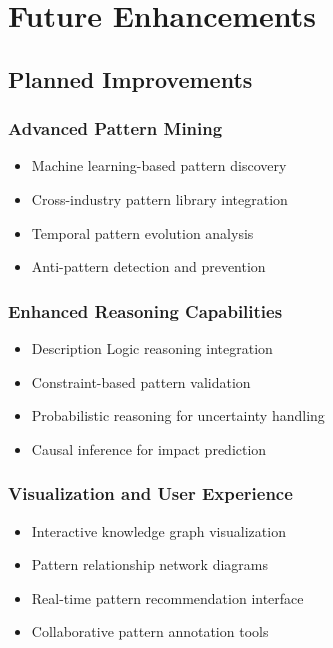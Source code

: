 \documentclass[12pt,a4paper]{article}
\begin{document}
\section{Future Enhancements}

\subsection{Planned Improvements}

\subsubsection{Advanced Pattern Mining}
\begin{itemize}
    \item Machine learning-based pattern discovery
    \item Cross-industry pattern library integration
    \item Temporal pattern evolution analysis
    \item Anti-pattern detection and prevention
\end{itemize}

\subsubsection{Enhanced Reasoning Capabilities}
\begin{itemize}
    \item Description Logic reasoning integration
    \item Constraint-based pattern validation
    \item Probabilistic reasoning for uncertainty handling
    \item Causal inference for impact prediction
\end{itemize}

\subsubsection{Visualization and User Experience}
\begin{itemize}
    \item Interactive knowledge graph visualization
    \item Pattern relationship network diagrams
    \item Real-time pattern recommendation interface
    \item Collaborative pattern annotation tools
\end{itemize}
\end{document}

